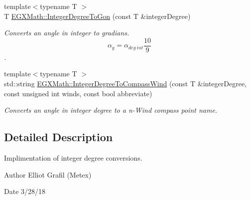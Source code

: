 \begin{DoxyCompactItemize}
{\footnotesize template$<$typename T $>$ }\\T \mbox{\hyperlink{group___e_g_x_math-_angle_conversions-_integer_degree_ga6e5be425c37ad27319f09329156c64bb}{E\+G\+X\+Math\+::\+Integer\+Degree\+To\+Gon}} (const T \&integer\+Degree)
\begin{DoxyCompactList}\small\item\em Converts an angle in integer to gradians. \[\alpha_{g}=\alpha_{deg\ int}\frac{10}{9}\]. \end{DoxyCompactList}\item 
{\footnotesize template$<$typename T $>$ }\\std\+::string \mbox{\hyperlink{group___e_g_x_math-_angle_conversions-_integer_degree_ga01abeefd29282a3c88d3d3c28fd2c6fa}{E\+G\+X\+Math\+::\+Integer\+Degree\+To\+Compass\+Wind}} (const T \&integer\+Degree, const unsigned int winds, const bool abbreviate)
\begin{DoxyCompactList}\small\item\em Converts an angle in integer degree to a n-\/\+Wind compass point name. \end{DoxyCompactList}\end{DoxyCompactItemize}


\subsection{Detailed Description}
Implimentation of integer degree conversions. 

\begin{DoxyAuthor}{Author}
Elliot Grafil (Metex) 
\end{DoxyAuthor}
\begin{DoxyDate}{Date}
3/28/18 
\end{DoxyDate}
